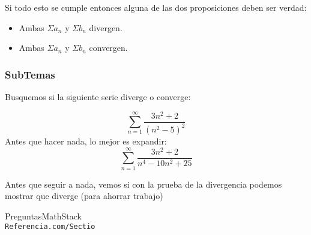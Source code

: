 \documentclass[12pt]{article}                               %
\begin{document}
Si todo esto se cumple entonces alguna de las dos proposiciones deben ser verdad:
\begin{itemize}
    \item Ambas $\Sigma a_n$ y $\Sigma b_n$ divergen.
    \item Ambas $\Sigma a_n$ y $\Sigma b_n$ convergen.
\end{itemize}

\subsubsection{SubTemas}
Busquemos si la siguiente serie diverge o converge:

\begin{equation}
    \sum_{n = 1}^{\infty} \frac{3n^2 + 2}{(n^2 - 5 )^2} 
\end{equation}
Antes que hacer nada, lo mejor es expandir:
\begin{equation}
    \sum_{n = 1}^{\infty} \frac{3n^2 + 2}{n^4 - 10n^2 + 25} 
\end{equation}

Antes que seguir a nada, vemos si con la prueba de la divergencia podemos mostrar que diverge (para ahorrar trabajo)
 

\cite{Sitio1}


\clearpage

    \begin{thebibliography}{9}

        PreguntasMathStack
        \\\texttt{Referencia.com/Sectio}


     

\end{thebibliography}
\end{document}
